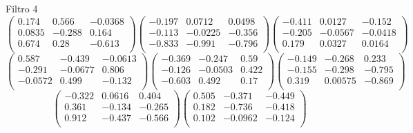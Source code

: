 Filtro 4
{ \small
\[
\begin{pmatrix}
  0.174 & 0.566 & -0.0368 \\
  0.0835 & -0.288 & 0.164 \\
  0.674 & 0.28 & -0.613 \\
\end{pmatrix}
\begin{pmatrix}
  -0.197 & 0.0712 & 0.0498 \\
  -0.113 & -0.0225 & -0.356 \\
  -0.833 & -0.991 & -0.796 \\
\end{pmatrix}
\begin{pmatrix}
  -0.411 & 0.0127 & -0.152 \\
  -0.205 & -0.0567 & -0.0418 \\
  0.179 & 0.0327 & 0.0164 \\
\end{pmatrix}
\]
\[
\begin{pmatrix}
  0.587 & -0.439 & -0.0613 \\
  -0.291 & -0.0677 & 0.806 \\
  -0.0572 & 0.499 & -0.132 \\
\end{pmatrix}
\begin{pmatrix}
  -0.369 & -0.247 & 0.59 \\
  -0.126 & -0.0503 & 0.422 \\
  -0.603 & 0.492 & 0.17 \\
\end{pmatrix}
\begin{pmatrix}
  -0.149 & -0.268 & 0.233 \\
  -0.155 & -0.298 & -0.795 \\
  0.319 & 0.00575 & -0.869 \\
\end{pmatrix}
\]
\[
\begin{pmatrix}
  -0.322 & 0.0616 & 0.404 \\
  0.361 & -0.134 & -0.265 \\
  0.912 & -0.437 & -0.566 \\
\end{pmatrix}
\begin{pmatrix}
  0.505 & -0.371 & -0.449 \\
  0.182 & -0.736 & -0.418 \\
  0.102 & -0.0962 & -0.124 \\
\end{pmatrix}
\]
}

